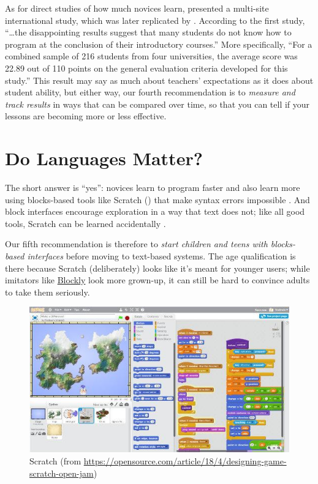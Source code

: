 As for direct studies of how much novices learn, \cite{McCr2001}
presented a multi-site international study, which was later replicated
by \cite{Utti2013}.  According to the first study, ``{\ldots}the
disappointing results suggest that many students do not know how to
program at the conclusion of their introductory courses.''  More
specifically, ``For a combined sample of 216 students from four
universities, the average score was 22.89 out of 110 points on the
general evaluation criteria developed for this study.''  This result
may say as much about teachers' expectations as it does about student
ability, but either way, our fourth recommendation is to \emph{measure
  and track results} in ways that can be compared over time, so that
you can tell if your lessons are becoming more or less effective.

\section{Do Languages Matter?}\label{s:pck-language}

The short answer is ``yes'': novices learn to program faster and also
learn more using blocks-based tools like Scratch
() that make syntax errors impossible
\cite{Wein2017b}.  And block interfaces encourage exploration in a way
that text does not; like all good tools, Scratch can be learned
accidentally \cite{Malo2010}.

Our fifth recommendation is therefore to \emph{start children and
  teens with blocks-based interfaces} before moving to text-based
systems.  The age qualification is there because Scratch
(deliberately) looks like it's meant for younger users; while
imitators like \href{https://developers.google.com/blockly/}{Blockly}
look more grown-up, it can still be hard to convince adults to take
them seriously.

\begin{figure}
\centering
\includegraphics{../docs/fig/scratch.jpg}
\caption{Scratch (from \url{https://opensource.com/article/18/4/designing-game-scratch-open-jam})}
\label{f:pck-scratch}
\end{figure}

